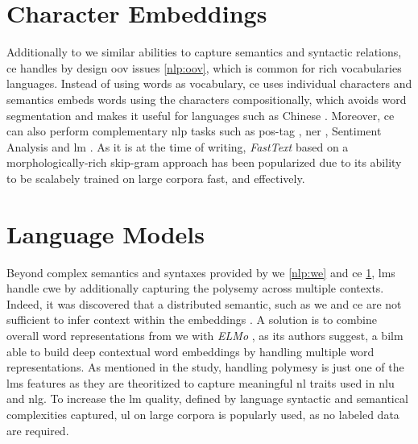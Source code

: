 \section{Character Embeddings}
\label{nlp:ce}
Additionally to \gls{we} similar abilities to capture semantics and syntactic relations, \gls{ce} handles by design \gls{oov} issues \ref{nlp:oov}, which is common for rich vocabularies languages. Instead of using words as vocabulary, \gls{ce} uses individual characters and semantics embeds words using the characters compositionally, which avoids word segmentation and makes it useful for languages such as Chinese \autocite{paper:conf/ijcai/ChenXLSL15}. Moreover, \gls{ce} can also perform complementary \gls{nlp} tasks such as \gls{pos-tag} \autocite{paper:conf/icml/SantosZ14}, \gls{ner} \autocite{paper:ma-etal-2016-label}, Sentiment Analysis \autocite{paper:2017HaoYetal} and \gls{lm} \autocite{paper:journals/corr/KimJSR15}. As it is at the time of writing, \textit{FastText} based on a morphologically-rich skip-gram approach \autocite{paper:journals/corr/BojanowskiGJM16} has been popularized due to its ability to be scalabely trained on large corpora fast, and effectively. 

\section{Language Models}
\label{nlp-lm}
Beyond complex semantics and syntaxes provided by \gls{we} \ref{nlp:we} and \gls{ce} \ref{nlp:ce}, \glspl{lm} handle \gls{cwe} by additionally capturing the polysemy across multiple contexts. Indeed, it was discovered that a distributed semantic, such as \gls{we} and \gls{ce} are not sufficient to infer context within the embeddings \autocite{paper:journals/corr/LucyG17}. A solution is to combine overall word representations from \gls{we} with \textit{ELMo} \autocite{paper:journals/corr/abs-1802-05365}, as its authors suggest, a \gls{bilm} able to build deep contextual word embeddings by handling multiple word representations. As mentioned in the study, handling polymesy is just one of the \glspl{lm} features as they are theoritized to capture meaningful \gls{nl} traits used in \gls{nlu} and \gls{nlg}. To increase the \gls{lm} quality, defined by language syntactic and semantical complexities captured, \gls{ul} on large corpora is popularly used, as no labeled data are required.


